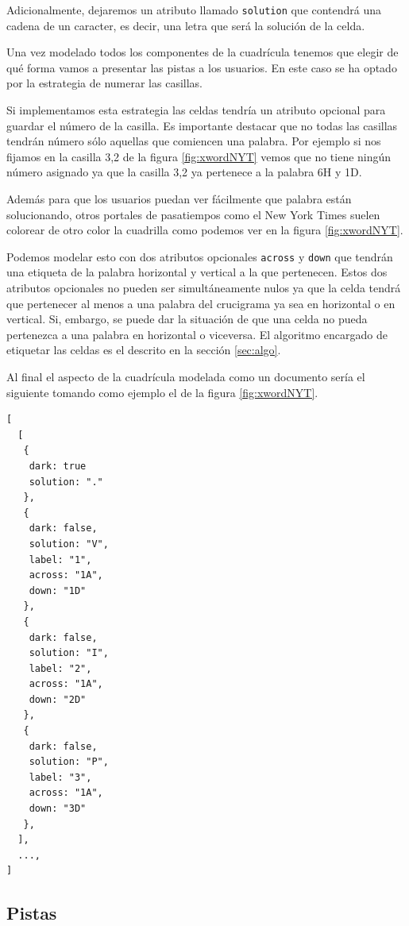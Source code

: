\documentclass[12pt, a4paper]{article}
\begin{document}
Adicionalmente, dejaremos un atributo llamado \verb*|solution| que contendrá una
cadena de un caracter, es decir, una letra que será la solución de la celda.

Una vez modelado todos los componentes de la cuadrícula tenemos que elegir de
qué forma vamos a presentar las pistas a los usuarios. En este caso se ha optado
por la estrategia de numerar las casillas.

Si implementamos esta estrategia las celdas tendría un atributo opcional para
guardar el número de la casilla. Es importante destacar que no todas las casillas
tendrán número sólo aquellas que comiencen una palabra. Por ejemplo si nos fijamos
en la casilla 3,2 de la figura \ref{fig:xwordNYT} vemos que no tiene ningún número
asignado ya que la casilla 3,2 ya pertenece a la palabra 6H y 1D.

Además para que los usuarios puedan ver fácilmente que palabra están solucionando,
otros portales de pasatiempos como el New York Times suelen colorear de otro color
la cuadrilla como podemos ver en la figura \ref{fig:xwordNYT}.

Podemos modelar esto con dos atributos opcionales \verb*|across| y \verb*|down|
que tendrán una etiqueta de la palabra horizontal y vertical a la que pertenecen.
Estos dos atributos opcionales no pueden ser simultáneamente nulos ya que la celda
tendrá que pertenecer al menos a una palabra del crucigrama ya sea en horizontal
o en vertical. Si, embargo, se puede dar la situación de que una celda no pueda
pertenezca a una palabra en horizontal o viceversa. El algoritmo encargado de 
etiquetar las celdas es el descrito en la sección \ref{sec:algo}.


Al final el aspecto de la cuadrícula modelada como un documento 
sería el siguiente tomando como ejemplo el de la figura \ref{fig:xwordNYT}.

\begin{verbatim}
[
  [
   { 
   	dark: true
   	solution: "."
   },
   {
   	dark: false,
   	solution: "V",
   	label: "1",
   	across: "1A",
   	down: "1D" 
   },
   {
   	dark: false,
   	solution: "I",
   	label: "2",
   	across: "1A",
   	down: "2D"
   },
   {
   	dark: false,
   	solution: "P",
   	label: "3",
   	across: "1A",
   	down: "3D"
   },
  ],
  ...,
]
\end{verbatim}

\subsection{Pistas}
\end{document}
